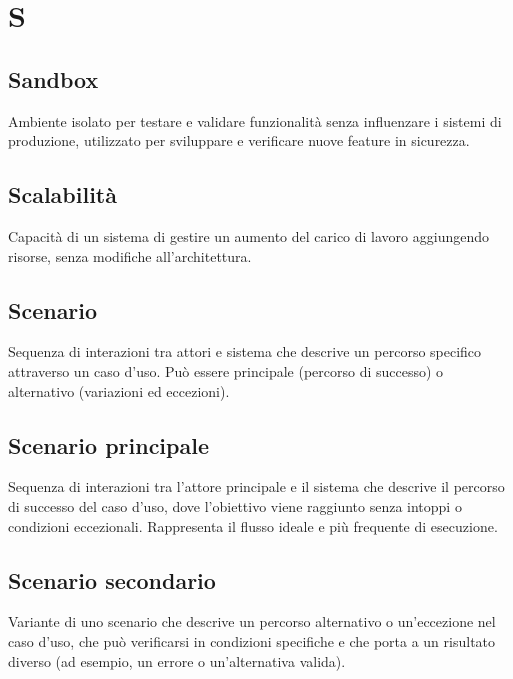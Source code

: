 \documentclass[a4paper,11pt]{article}
\begin{document}
\section{S}

\subsection{Sandbox}
Ambiente isolato per testare e validare funzionalità senza influenzare i sistemi di produzione, utilizzato per sviluppare e verificare nuove feature in sicurezza.






\subsection{Scalabilità}
Capacità di un sistema di gestire un aumento del carico di lavoro aggiungendo risorse, senza modifiche all'architettura.









\subsection{Scenario}
Sequenza di interazioni tra attori e sistema che descrive un percorso specifico attraverso un caso d'uso. Può essere principale (percorso di successo) o alternativo (variazioni ed eccezioni).









\subsection{Scenario principale}
Sequenza di interazioni tra l'attore principale e il sistema che descrive il percorso di successo del caso d'uso, dove l'obiettivo viene raggiunto senza intoppi o condizioni eccezionali. Rappresenta il flusso ideale e più frequente di esecuzione.


\subsection{Scenario secondario}
Variante di uno scenario che descrive un percorso alternativo o un'eccezione nel caso d'uso, che può verificarsi in condizioni specifiche e che porta a un risultato diverso (ad esempio, un errore o un'alternativa valida).
\end{document}
